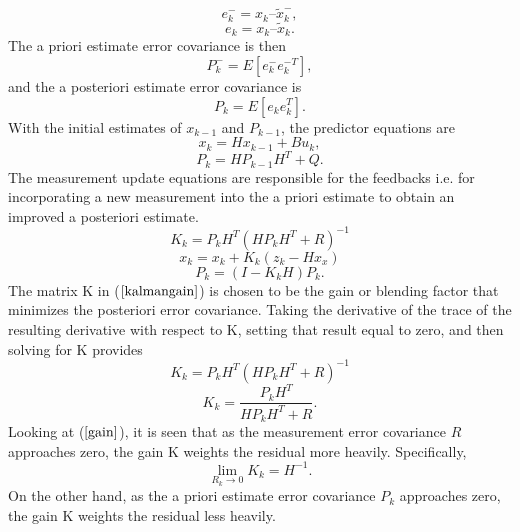 \documentclass[journal]{IEEEtran}
\begin{document}
\begin{equation}
e_k^- = x_k – \tilde x_k^- ,
\end{equation}
\begin{equation}
e_k =  x_k – \tilde x_k.
\end{equation}
The a priori estimate error covariance is then
\begin{equation}
P_k^- = E[ e_k^- e_k^{-T} ],
\end{equation}
and the a posteriori estimate error covariance is
\begin{equation}
P_k = E[e_k e_k^T].
\end{equation}
With the initial estimates of $x_{k-1}$ and $P_{k-1}$, the predictor equations are 
\begin{equation}
x_k = Hx_{k-1} + Bu_k,
\end{equation}
\begin{equation}
P_k = HP_{k-1}H^T + Q.
\end{equation}
The measurement update equations are responsible for the feedbacks
i.e. for incorporating a new measurement into the a priori estimate
to obtain an improved a posteriori estimate.
\begin{equation}
K_k = P_kH^T(HP_kH^T + R)^{-1} \label{kalmangain}
\end{equation}
\begin{equation}
x_k = x_k + K_k(z_k - Hx_x)
\end{equation}
\begin{equation}
P_k = (I-K_kH)P_k.
\end{equation}
The matrix K in ($\ref{kalmangain}$) is
chosen to be the gain or blending factor that minimizes the
posteriori error covariance. Taking the derivative of the trace of
the resulting derivative with respect to K, setting that result equal to zero, and
then solving for K provides
\begin{equation}
K_k = P_kH^{T}(HP_kH^{T} + R)^{-1}
\end{equation}
\begin{equation}
K_k = \frac{P_kH^T}{HP_kH^T + R}. \label{gain}
\end{equation}
Looking at ($\ref{gain}$), it is seen that as the measurement error
covariance $R$ approaches zero, the gain K weights the residual more
heavily. Specifically,
\begin{equation}
\mathop {\lim }\limits_{R_k \to 0 } {K_k} = H^{-1}.
\end{equation}
On the other hand, as the a priori estimate error covariance $P_k$
approaches zero, the gain K weights the residual less heavily.
\end{document}
